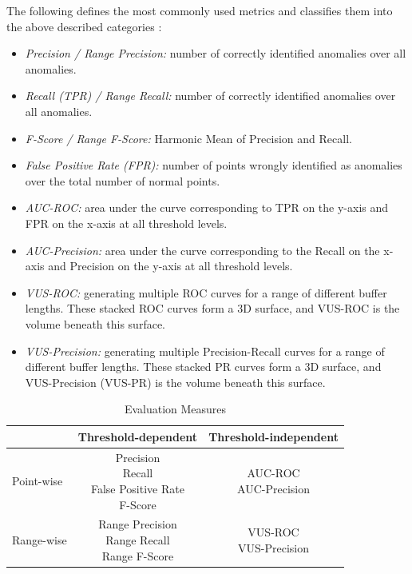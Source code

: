 \documentclass[12pt,oneside]{article}
\begin{document}
The following defines the most commonly used metrics and classifies them into the above described categories \parencites[p.2776-2780]{papaVus}:
\begin{itemize}
    \item \textit{Precision / Range Precision:} number of correctly identified anomalies over all anomalies.
    \item \textit{Recall (TPR) / Range Recall:} number of correctly identified anomalies over all anomalies.
    \item \textit{F-Score / Range F-Score:} Harmonic Mean of Precision and Recall. 
    \item \textit{False Positive Rate (FPR):} number of points wrongly identified as anomalies over the total number of normal points.
    \item \textit{AUC-ROC:} area under the curve corresponding to TPR on the y-axis and FPR on the x-axis at all threshold levels.
    \item \textit{AUC-Precision:} area under the curve corresponding to the Recall on the x-axis and Precision on the y-axis at all threshold levels.
    \item \textit{VUS-ROC:} generating multiple ROC curves for a range of different buffer lengths. These stacked ROC curves form a 3D surface, and VUS-ROC is the volume beneath this surface.
    \item \textit{VUS-Precision:} generating multiple Precision-Recall curves for a range of different buffer lengths. These stacked PR curves form a 3D surface, and VUS-Precision (VUS-PR) is the volume beneath this surface.
\end{itemize}




\begin{table}[htbp]
  \centering
  \label{tab:evaluation_categories}

  \begin{tabular}{lcc}
    \toprule
    & Threshold-dependent & Threshold-independent \\
    \midrule
    Point-wise & \makecell[l]{Precision \\ Recall \\ False Positive Rate \\ F-Score} & \makecell[l]{AUC-ROC \\ AUC-Precision} \\
    \midrule
    Range-wise & \makecell[l]{Range Precision \\ Range Recall \\ Range F-Score} & \makecell[l]{VUS-ROC \\ VUS-Precision} \\
    \bottomrule
  \end{tabular}
  \caption{Evaluation Measures}

\end{table}
\end{document}
